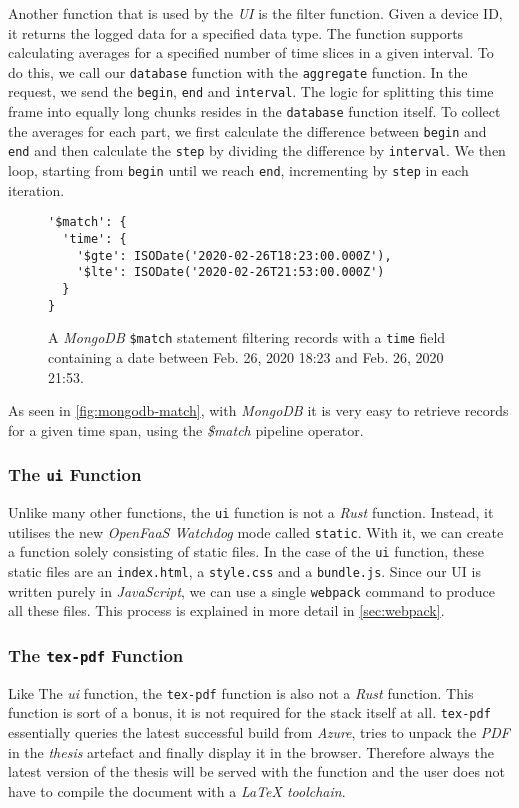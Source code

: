 Another function that is used by the \textit{UI} is the filter function. Given a device ID, it
returns the logged data for a specified data type. The function supports calculating averages for a
specified number of time slices in a given interval. To do this, we call our \texttt{database}
function with the \texttt{aggregate} function. In the request, we send the \texttt{begin},
\texttt{end} and \texttt{interval}. The logic for splitting this time frame into equally long chunks
resides in the \texttt{database} function itself. To collect the averages for each part, we first
calculate the difference between \texttt{begin} and \texttt{end} and then calculate the
\texttt{step} by dividing the difference by \texttt{interval}. We then loop, starting from
\texttt{begin} until we reach \texttt{end}, incrementing by \texttt{step} in each iteration.

\begin{figure}[H]
  \begin{lstlisting}
'$match': {
  'time': {
    '$gte': ISODate('2020-02-26T18:23:00.000Z'),
    '$lte': ISODate('2020-02-26T21:53:00.000Z')
  }
}
  \end{lstlisting}
  \caption{A \textit{MongoDB} \texttt{\$match} statement filtering records with a \texttt{time}
  field containing a date between Feb. 26, 2020 18:23 and Feb. 26, 2020 21:53.}
  \label{fig:mongodb-match}
\end{figure}

As seen in \autoref{fig:mongodb-match}, with \textit{MongoDB} it is very easy to retrieve records for a
given time span, using the \textit{\$match} pipeline operator.

\subsubsection{The \texttt{ui} Function}

Unlike many other functions, the \texttt{ui} function is not a \textit{Rust} function. Instead, it
utilises the new \textit{OpenFaaS Watchdog} mode called \texttt{static}. With it, we can create a
function solely consisting of static files. In the case of the \texttt{ui} function, these static
files are an \texttt{index.html}, a \texttt{style.css} and a \texttt{bundle.js}. Since our UI is
written purely in \textit{JavaScript}, we can use a single \texttt{webpack} command to produce all
these files. This process is explained in more detail in \autoref{sec:webpack}.

\subsubsection{The \texttt{tex-pdf} Function}

Like The \textit{ui} function, the \texttt{tex-pdf} function is also not a \textit{Rust} function.
This function is sort of a bonus, it is not required for the stack itself at all. \texttt{tex-pdf}
essentially queries the latest successful build from \textit{Azure}, tries to unpack the
\textit{PDF} in the \textit{thesis} artefact and finally display it in the browser. Therefore always
the latest version of the thesis will be served with the function and the user does not have to
compile the document with a \textit{LaTeX toolchain}.

